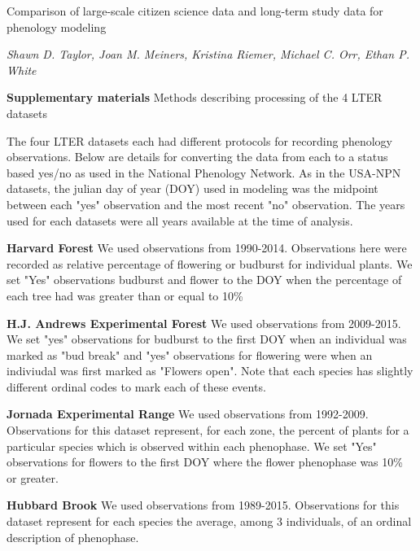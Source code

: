 \documentclass[a4paper,12pt]{article}
\begin{document}
{\Large Comparison of large-scale citizen science data and long-term study data for phenology modeling \par} \newline

\textit{Shawn D. Taylor, Joan M. Meiners, Kristina Riemer, Michael C. Orr, Ethan P. White} \newline

{\Large \textbf{Supplementary materials}} \newline
Methods describing processing of the 4 LTER datasets

The four LTER datasets each had different protocols for recording phenology observations. Below are details for converting the data from each to a status based yes/no as used in the National Phenology Network. As in the USA-NPN datasets, the julian day of year (DOY) used in modeling was the midpoint between each "yes" observation and the most recent "no" observation. The years used for each datasets were all years available at the time of analysis. 

\textbf{Harvard Forest} \newline
We used observations from 1990-2014. Observations here were recorded as relative percentage of flowering or budburst for individual plants. We set "Yes" observations budburst and flower to the DOY when the percentage of each tree had was greater than or equal to 10\%

\textbf{H.J. Andrews Experimental Forest} \newline
We used observations from 2009-2015. We set "yes" observations for budburst to the first DOY when an individual was marked as "bud break" and "yes" observations for flowering were when an indiviudal was first marked as "Flowers open". Note that each species has slightly different ordinal codes to mark each of these events. 

\textbf{Jornada Experimental Range} \newline
We used observations from 1992-2009. Observations for this dataset represent, for each zone, the percent of plants for a particular species which is observed within each phenophase. We set "Yes" observations for flowers to the first DOY where the flower phenophase was 10\% or greater.

\textbf{Hubbard Brook} \newline
We used observations from 1989-2015. Observations for this dataset represent for each species the average, among 3 individuals, of an ordinal description of phenophase. \newline
\end{document}
